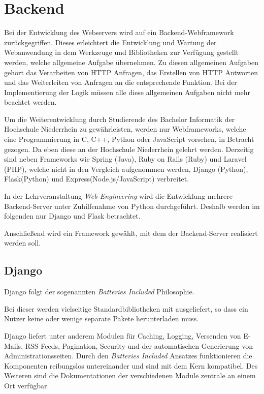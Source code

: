 \section{Backend} \label{sec:Backend}
Bei der Entwicklung des Webservers wird auf ein Backend-Webframework zurückgegriffen. Dieses erleichtert die Entwicklung und Wartung der Webanwendung in dem Werkzeuge und Bibliotheken zur Verfügung gestellt werden, welche allgemeine Aufgabe übernehmen. Zu diesen allgemeinen Aufgaben gehört das Verarbeiten von HTTP Anfragen, das Erstellen von HTTP Antworten und das Weiterleiten von Anfragen an die entsprechende Funktion. Bei der Implementierung der Logik müssen alle diese allgemeinen Aufgaben nicht mehr beachtet werden.

Um die Weiterentwicklung durch Studierende des Bachelor Informatik der Hochschule Niederrhein zu gewährleisten, werden nur Webframeworks, welche eine Programmierung in C, C++, Python oder JavaScript vorsehen, in Betracht gezogen. Da eben diese an der Hochschule Niederrhein gelehrt werden. Derzeitig sind neben Frameworks wie Spring (Java), Ruby on Rails (Ruby) und Laravel (PHP), welche nicht in den Vergleich aufgenommen werden, Django (Python), Flask(Python) und Express(Node.js/JavaScript) verbreitet.\cite{mdncontributorsServersideWebFrameworks2020}

In der Lehrveranstaltung \textit{Web-Engineering} wird die Entwicklung mehrere Backend-Server unter Zuhilfenahme von Python durchgeführt. Deshalb werden im folgenden nur Django und Flask betrachtet. 

Anschließend wird ein Framework gewählt, mit dem der Backend-Server realisiert werden soll.

\subsection{Django}\label{subsec:Django}
Django folgt der sogenannten \textit{Batteries Included} Philosophie. 

Bei dieser werden vielseitige Standardbibliotheken mit ausgeliefert, so dass ein Nutzer keine oder wenige separate Pakete herunterladen muss.\cite{kuchlingPEP206Python}

Django liefert unter anderem Modulen für Caching, Logging, Versenden von E-Mails, RSS-Feeds, Pagination, Security und der automatischen Generierung von Administrationsseiten. \cite{djangoDjangoDocumentationDjango} Durch den \textit{Batteries Included} Ansatzes funktionieren die Komponenten reibungslos untereinander und sind mit dem Kern kompatibel. Des Weiteren sind die Dokumentationen der verschiedenen Module zentrale an einem Ort verfügbar. 

